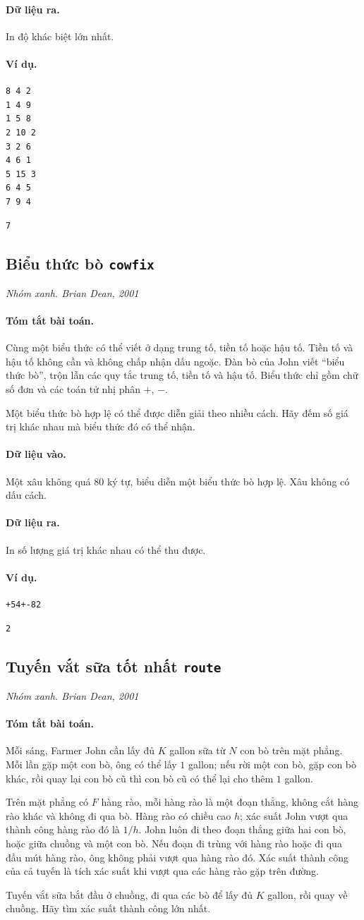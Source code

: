 \documentclass[11pt]{article}
\newcommand{\problem}[4]{%
  \subsection[#1 (#2)]{#1 \hfill {\normalsize\texttt{#2}}}%
  \noindent\textit{#3. #4}\par\smallskip
}
\newcommand{\iosec}[1]{\paragraph{#1}}
\begin{document}
\iosec{Dữ liệu ra.}
In độ khác biệt lớn nhất.

\iosec{Ví dụ.}
\begin{verbatim}
8 4 2
1 4 9
1 5 8
2 10 2
3 2 6
4 6 1
5 15 3
6 4 5
7 9 4
\end{verbatim}

\begin{verbatim}
7
\end{verbatim}

\problem{Biểu thức bò}{cowfix}{Nhóm xanh}{Brian Dean, 2001}

\iosec{Tóm tắt bài toán.}
Cùng một biểu thức có thể viết ở dạng trung tố, tiền tố hoặc hậu tố. Tiền tố
và hậu tố không cần và không chấp nhận dấu ngoặc. Đàn bò của John viết
``biểu thức bò'', trộn lẫn các quy tắc trung tố, tiền tố và hậu tố. Biểu thức
chỉ gồm chữ số đơn và các toán tử nhị phân \(+\), \(-\).

Một biểu thức bò hợp lệ có thể được diễn giải theo nhiều cách. Hãy đếm số giá
trị khác nhau mà biểu thức đó có thể nhận.

\iosec{Dữ liệu vào.}
Một xâu không quá \(80\) ký tự, biểu diễn một biểu thức bò hợp lệ. Xâu không
có dấu cách.

\iosec{Dữ liệu ra.}
In số lượng giá trị khác nhau có thể thu được.

\iosec{Ví dụ.}
\begin{verbatim}
+54+-82
\end{verbatim}

\begin{verbatim}
2
\end{verbatim}

\problem{Tuyến vắt sữa tốt nhất}{route}{Nhóm xanh}{Brian Dean, 2001}

\iosec{Tóm tắt bài toán.}
Mỗi sáng, Farmer John cần lấy đủ \(K\) gallon sữa từ \(N\) con bò trên mặt
phẳng. Mỗi lần gặp một con bò, ông có thể lấy \(1\) gallon; nếu rời một con
bò, gặp con bò khác, rồi quay lại con bò cũ thì con bò cũ có thể lại cho thêm
\(1\) gallon.

Trên mặt phẳng có \(F\) hàng rào, mỗi hàng rào là một đoạn thẳng, không cắt
hàng rào khác và không đi qua bò. Hàng rào có chiều cao \(h\); xác suất John
vượt qua thành công hàng rào đó là \(1/h\). John luôn đi theo đoạn thẳng giữa
hai con bò, hoặc giữa chuồng và một con bò. Nếu đoạn đi trùng với hàng rào
hoặc đi qua đầu mút hàng rào, ông không phải vượt qua hàng rào đó. Xác suất
thành công của cả tuyến là tích xác suất khi vượt qua các hàng rào gặp trên
đường.

Tuyến vắt sữa bắt đầu ở chuồng, đi qua các bò để lấy đủ \(K\) gallon, rồi quay
về chuồng. Hãy tìm xác suất thành công lớn nhất.
\end{document}
